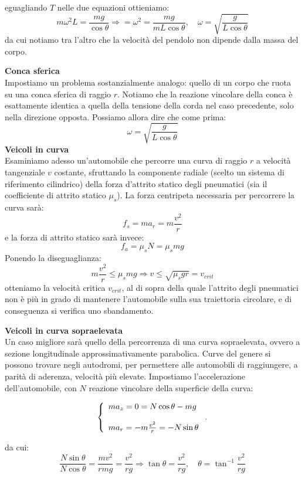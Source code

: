 \documentclass[a4paper,12pt]{article}
\begin{document}
eguagliando $T$ nelle due equazioni ottieniamo:
$$ m\omega^2L = \frac{mg}{\cos{\theta}} \Rightarrow = \omega^2 = \frac{mg}{mL\cos{\theta}}, \quad \omega = \sqrt{\frac{g}{L\cos{\theta}}}$$
da cui notiamo tra l'altro che la velocità del pendolo non dipende dalla massa del corpo.
\par\smallskip
\textbf{Conca sferica} \\
Impostiamo un problema sostanzialmente analogo: quello di un corpo che ruota su una conca sferica di raggio $r$. Notiamo che la reazione
vincolare della conca è esattamente identica a quella della tensione della corda nel caso precedente, solo nella direzione opposta. Possiamo allora
dire che come prima:
$$ \omega = \sqrt{\frac{g}{L\cos{\theta}}}$$
\newpage
\textbf{Veicoli in curva} \\
Esaminiamo adesso un'automobile che percorre una curva di raggio $r$ a velocità tangenziale $v$ costante, sfruttando
la componente radiale (scelto un sistema di riferimento cilindrico) della forza d'attrito statico degli pneumatici 
(sia il coefficiente di attrito statico $\mu_s$). La forza centripeta necessaria per percorrere la curva sarà:
$$ f_s = ma_r = m\frac{v^2}{r}$$
e la forza di attrito statico sarà invece:
$$ f_a = \mu_sN = \mu_s mg $$
Ponendo la diseguaglianza:
$$ m \frac{v^2}{r} \leq \mu_s mg \Rightarrow v \leq \sqrt{\mu_s gr} = v_{crit} $$
otteniamo la velocità critica $v_{crit}$, al di sopra della quale l'attrito degli pneumatici non è più in grado
di mantenere l'automobile sulla sua traiettoria circolare, e di conseguenza si verifica uno sbandamento.
\par\smallskip
\textbf{Veicoli in curva sopraelevata} \\
Un caso migliore sarà quello della percorrenza di una curva sopraelevata, ovvero a sezione longitudinale approssimativamente
parabolica. Curve del genere si possono trovare negli autodromi, per permettere alle automobili di raggiungere,
a parità di aderenza, velocità più elevate. Impostiamo l'accelerazione dell'automobile, con $N$ reazione vincolare
della superficie della curva:

$$
\begin{aligned}
\left\{\begin{array}{l}
  ma_z = 0 = N\cos{\theta} - mg \cr \\
  ma_r = -m\frac{v^2}{r} = -N\sin{\theta}
\end{array}\right..
\end{aligned}
$$

da cui:
$$ \frac{N\sin{\theta}}{N\cos{\theta}} = \frac{mv^2}{rmg} = \frac{v^2}{rg} \Rightarrow \tan{\theta} = \frac{v^2}{rg}, \quad \theta = \tan^{-1}{\frac{v^2}{rg}}$$
\end{document}
